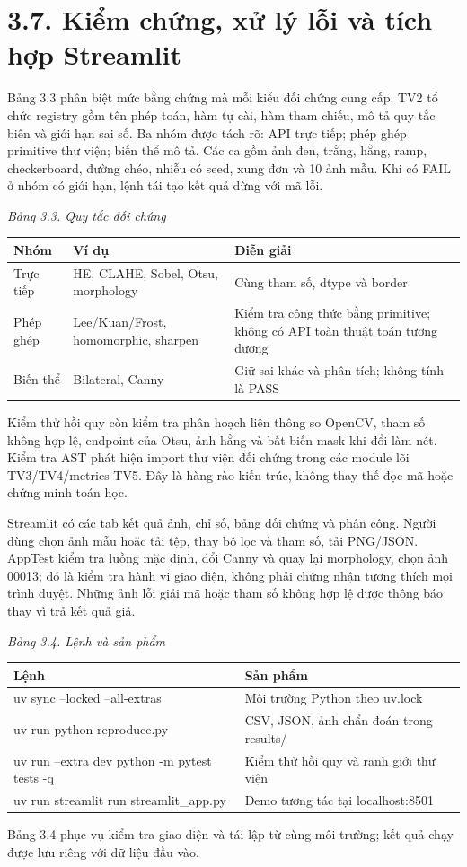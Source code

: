 \documentclass[13pt,a4paper]{extreport}
\begin{document}
\section*{3.7. Kiểm chứng, xử lý lỗi và tích hợp Streamlit}
Bảng 3.3 phân biệt mức bằng chứng mà mỗi kiểu đối chứng cung cấp. TV2 tổ chức registry gồm tên phép toán, hàm tự cài, hàm tham chiếu, mô tả quy tắc biên và giới hạn sai số. Ba nhóm được tách rõ: API trực tiếp; phép ghép primitive thư viện; biến thể mô tả. Các ca gồm ảnh đen, trắng, hằng, ramp, checkerboard, đường chéo, nhiễu có seed, xung đơn và 10 ảnh mẫu. Khi có FAIL ở nhóm có giới hạn, lệnh tái tạo kết quả dừng với mã lỗi.
\par
\noindent\textit{Bảng 3.3. Quy tắc đối chứng}
\begin{longtable}{p{4.87cm}|p{4.87cm}|p{4.87cm}}
Nhóm & Ví dụ & Diễn giải\\\hline
Trực tiếp & HE, CLAHE, Sobel, Otsu, morphology & Cùng tham số, dtype và border\\\hline
Phép ghép & Lee/Kuan/Frost, homomorphic, sharpen & Kiểm tra công thức bằng primitive; không có API toàn thuật toán tương đương\\\hline
Biến thể & Bilateral, Canny & Giữ sai khác và phân tích; không tính là PASS\\\hline
\end{longtable}
Kiểm thử hồi quy còn kiểm tra phân hoạch liên thông so OpenCV, tham số không hợp lệ, endpoint của Otsu, ảnh hằng và bất biến mask khi đổi làm nét. Kiểm tra AST phát hiện import thư viện đối chứng trong các module lõi TV3/TV4/metrics TV5. Đây là hàng rào kiến trúc, không thay thế đọc mã hoặc chứng minh toán học.
\par
Streamlit có các tab kết quả ảnh, chỉ số, bảng đối chứng và phân công. Người dùng chọn ảnh mẫu hoặc tải tệp, thay bộ lọc và tham số, tải PNG/JSON. AppTest kiểm tra luồng mặc định, đổi Canny và quay lại morphology, chọn ảnh 00013; đó là kiểm tra hành vi giao diện, không phải chứng nhận tương thích mọi trình duyệt. Những ảnh lỗi giải mã hoặc tham số không hợp lệ được thông báo thay vì trả kết quả giả.
\par
\noindent\textit{Bảng 3.4. Lệnh và sản phẩm}
\begin{longtable}{p{7.3cm}|p{7.3cm}}
Lệnh & Sản phẩm\\\hline
uv sync --locked --all-extras & Môi trường Python theo uv.lock\\\hline
uv run python reproduce.py & CSV, JSON, ảnh chẩn đoán trong results/\\\hline
uv run --extra dev python -m pytest tests -q & Kiểm thử hồi quy và ranh giới thư viện\\\hline
uv run streamlit run streamlit\_app.py & Demo tương tác tại localhost:8501\\\hline
\end{longtable}
Bảng 3.4 phục vụ kiểm tra giao diện và tái lập từ cùng môi trường; kết quả chạy được lưu riêng với dữ liệu đầu vào.
\par
\clearpage
\end{document}
